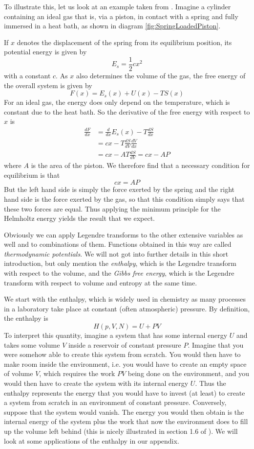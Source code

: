 \documentclass[a4paper, draft]{article}
\theoremstyle{own}
\theoremstyle{remark}
\begin{document}
To illustrate this, let us look at an example taken from \cite{Schwartz}. Imagine a cylinder containing an ideal gas that is, via a piston, in contact with a spring and fully immersed in a heat bath, as shown in diagram \ref{fig:SpringLoadedPiston}.

If $x$ denotes the displacement of the spring from its equilibrium position, its potential energy is given by
$$
E_s = \frac{1}{2} c x^2
$$
with a constant $c$. As $x$ also determines the volume of the gas, the free energy of the overall system is given by 
$$
F(x) = E_s(x) + U(x) - TS(x)
$$ 
For an ideal gas, the energy does only depend on the temperature, which is constant due to the heat bath. So the derivative of the free energy with respect to $x$ is
\begin{align*}
\frac{dF}{dx} &= \frac{d}{dx} E_s(x) - T \frac{dS}{dx} \\
&= c x - T \frac{dS}{dV} \frac{dV}{dx} \\
&= c x - A T \frac{dS}{dV} = cx - A P
\end{align*}
where $A$ is the area of the piston. We therefore find that a necessary condition for equilibrium is that
$$
cx =  A P
$$
But the left hand side is simply the force exerted by the spring and the right hand side is the force exerted by the gas, so that this condition simply says that these two forces are equal. Thus applying the minimum principle for the Helmholtz energy yields the result that we expect.


Obviously we can apply Legendre transforms to the other extensive variables as well and to combinations of them. Functions obtained in this way are called {\em thermodynamic potentials}. We will not got into further details in this short introduction, but only mention the {\em enthalpy}, which is the Legendre transform with respect to the volume, and the {\em Gibbs free energy}, which is the Legendre transform with respect to volume and entropy at the same time.


We start with the enthalpy, which is widely used in chemistry as many processes in a laboratory take place at constant (often atmospheric) pressure. By definition, the enthalpy is
$$
H(p, V, N) = U + PV
$$
To interpret this quantity, imagine a system that has some internal energy $U$ and takes some volume $V$ inside a reservoir of constant pressure $P$. Imagine that you were somehow able to create this system from scratch. You would then have to make room inside the environment, i.e. you would have to create an empty space of volume $V$, which requires the work $PV$ being done on the environment, and you would then have to create the system with its internal energy $U$. Thus the enthalpy represents the energy that you would have to invest (at least) to create a system from scratch in an environment of constant pressure. Conversely, suppose that the system would vanish. The energy you would then obtain is the internal energy of the system plus the work that now the environment does to fill up the volume left behind (this is nicely illustrated in section 1.6 of \cite{Schroeder}). We will look at some applications of the enthalpy in our appendix.
\end{document}
